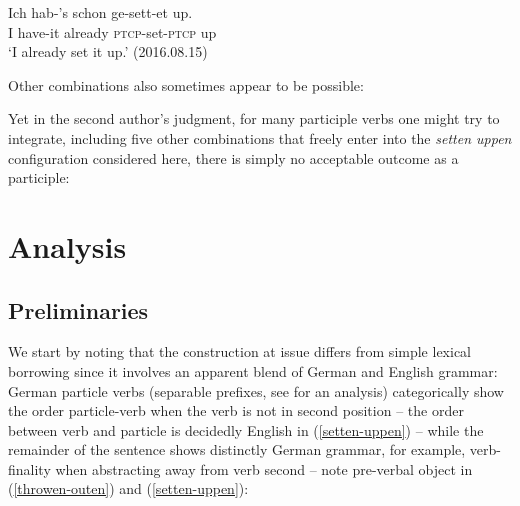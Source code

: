 \documentclass[output=paper]{langscibook}
\begin{document}
\ea\gll Ich hab-'s schon ge-sett-et up.\\
I have-it already \textsc{ptcp}-set-\textsc{ptcp} up\\
\glt `I already set it up.' (2016.08.15)
\z 

Other combinations also sometimes appear to be possible: 

\ea
{}
\z\z 

Yet in the second author's judgment, for many participle verbs one might try to integrate, including five other combinations that freely enter into the \textit{setten uppen} configuration considered here, there is simply no acceptable outcome as a participle:

\ea
{}
\z\z 

\section{Analysis}

\subsection{Preliminaries}

We start by noting that the construction at issue differs from simple lexical borrowing since it involves an apparent blend of German and English grammar: German particle verbs (separable prefixes, see \citet{wurmbrand98} for an analysis) categorically show the order particle-verb when the verb is not in second position -- the order between verb and particle is decidedly English in (\ref{setten-uppen}) -- while the remainder of the sentence shows distinctly German grammar, for example, verb-finality when abstracting away from verb second -- note pre-verbal object in (\ref{throwen-outen}) and (\ref{setten-uppen}):
\end{document}
